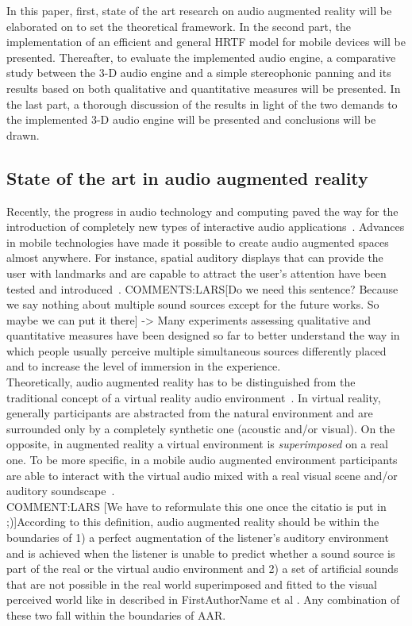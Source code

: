 \documentclass[journal]{IEEEtran}
\begin{document}
In this paper, first, state of the art research on audio augmented reality will be elaborated on to set the theoretical framework. In the second part, the implementation of an efficient and general HRTF model for mobile devices will be presented. Thereafter, to evaluate the implemented audio engine, a comparative study between the 3-D audio engine and a simple stereophonic panning and its results based on both qualitative and quantitative measures will be presented. In the last part, a thorough discussion of the results in light of the two demands to the implemented 3-D audio engine will be presented and conclusions will be drawn.

\subsection{State of the art in audio augmented reality}
Recently, the progress in audio technology and computing paved the way for the introduction of completely new types of interactive audio applications~\cite{harma2004}. Advances in mobile technologies have made it possible to create audio augmented spaces almost anywhere. For instance, spatial auditory displays that can provide the user with landmarks and are capable to attract the user's attention have been tested and introduced~\cite{alvarez2011}. COMMENTS:LARS[Do we need this sentence? Because we say nothing about multiple sound sources except for the future works. So maybe we can put it there] -> Many experiments assessing qualitative and quantitative measures have been designed so far to better understand the way in which people usually perceive multiple simultaneous sources differently placed and to increase the level of immersion in the experience.\\

Theoretically, audio augmented reality has to be distinguished from the traditional concept of a virtual reality audio environment~\cite{harma2004}. In virtual reality, generally participants are abstracted from the natural environment and are surrounded only by a completely synthetic one (acoustic and/or visual). On the opposite, in augmented reality a virtual environment is \emph{superimposed} on a real one. To be more specific, in a mobile audio augmented environment participants are able to interact with the virtual audio mixed with a real visual scene and/or auditory soundscape~\cite{alvarez2011}.\\

COMMENT:LARS [We have to reformulate this one once the citatio is put in ;)]According to this definition, audio augmented reality should be within the boundaries of 1) a perfect augmentation of the listener's auditory environment and is achieved when the listener is unable to predict whether a sound source is part of the real or the virtual audio environment and 2) a set of artificial sounds that are not possible in the real world superimposed and fitted to the visual perceived world like in described in FirstAuthorName et al \cite{}. Any combination of these two fall within the boundaries of AAR.\\
\end{document}
